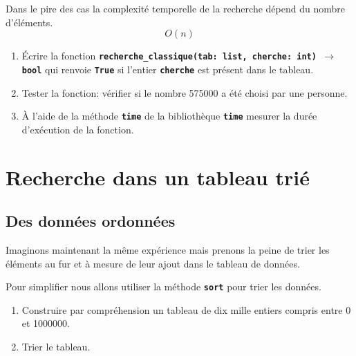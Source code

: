 \documentclass[a4paper,11pt]{article}
\begin{document}
\begin{aretenir}[]
Dans le pire des cas la complexité temporelle de la recherche dépend du nombre d'éléments.
$$O(n)$$
\end{aretenir}
\begin{activite}
    \begin{enumerate}
        \item Écrire la fonction \textbf{\texttt{recherche\_classique(tab: list, cherche: int) $\rightarrow$ bool}} qui renvoie \textbf{\texttt{True}} si l'entier \textbf{\texttt{cherche}} est présent dans le tableau.
        \item Tester la fonction: vérifier si le nombre 575000 a été choisi par une personne.
        \item À l'aide de la méthode \textbf{\texttt{time}} de la bibliothèque \textbf{\texttt{time}} mesurer la durée d'exécution de la fonction.
    \end{enumerate}
\end{activite}
\section{Recherche dans un tableau trié}
\subsection{Des données ordonnées}
Imaginons maintenant la même expérience mais prenons la peine de trier les éléments au fur et à mesure de leur ajout dans le tableau de données.
\begin{center}
\end{center}
\begin{activite}
Pour simplifier nous allons utiliser la méthode \textbf{\texttt{sort}} pour trier les données.
\begin{enumerate}
    \item Construire par compréhension un tableau de dix mille entiers compris entre 0 et 1000000.
    \item Trier le tableau.
\end{enumerate}
\end{activite}
\end{document}

